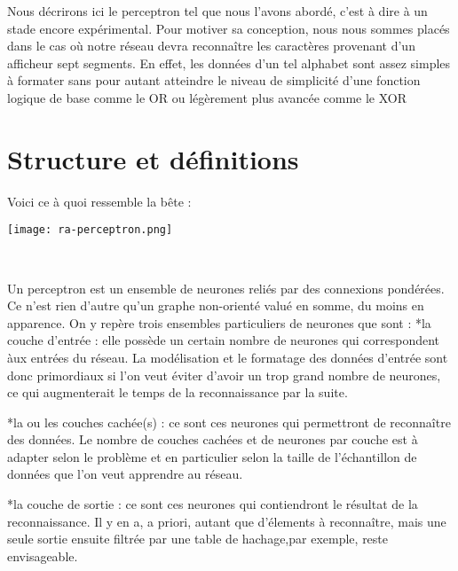 Nous d\'ecrirons ici le perceptron tel que nous l'avons abord\'e, c'est \`a
dire \`a un stade encore exp\'erimental. Pour motiver sa conception,
nous nous sommes plac\'es dans le cas o\`u notre r\'eseau devra
reconna\^itre les caract\`eres provenant d'un afficheur sept
segments. En effet, les donn\'ees d'un tel alphabet sont assez simples
\`a formater sans pour autant atteindre le niveau de simplicit\'e d'une
fonction logique de base comme le OR ou l\'eg\`erement plus avanc\'ee
comme le XOR

\pagebreak
\section{Structure et d\'efinitions} %
\label{subsec:structure_et_definitions}

Voici ce \`a quoi ressemble la b\^ete :
\begin{center}
	
	\texttt{[image: ra-perceptron.png]}\\
	\caption{\emph{Perceptron \`a une couche cach\'ee}}\\
\end{center}

Un perceptron est un ensemble de neurones reli\'es par des connexions
pond\'er\'ees. Ce n'est rien d'autre qu'un graphe non-orient\'e valu\'e
en somme, du moins en apparence. On y rep\`ere trois ensembles
particuliers de neurones que sont : 
*la couche d'entr\'ee : elle poss\`ede un certain nombre de neurones qui
correspondent \`aux entr\'ees du r\'eseau. La mod\'elisation et le
formatage des donn\'ees d'entr\'ee sont donc primordiaux si l'on veut
\'eviter d'avoir un trop grand nombre de neurones, ce qui augmenterait
le temps de la reconnaissance par la suite.

*la ou les couches cach\'ee(s) : ce sont ces neurones qui permettront de
reconna\^itre des donn\'ees. Le nombre de couches cach\'ees et de
neurones par couche est \`a adapter selon le probl\`eme et en
particulier selon la taille de l'\'echantillon de donn\'ees que l'on veut
apprendre au r\'eseau.

*la couche de sortie : ce sont ces neurones qui contiendront le
r\'esultat de la reconnaissance. Il y en a, a priori, autant que
d'\'elements \`a reconna\^itre, mais une seule sortie ensuite filtr\'ee
par une table de hachage,par exemple, reste envisageable.

